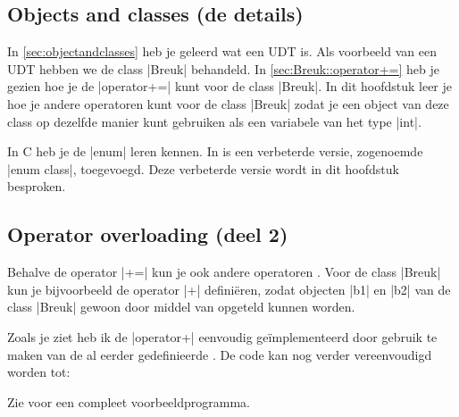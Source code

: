\begin{cpplstShortInline}
\chapter{Objects and classes (de details)}
\label{sec:objectsandclassesdetails}
In \cref{sec:objectandclasses} heb je geleerd wat een UDT is.
Als voorbeeld van een UDT hebben we de class |Breuk| behandeld.
In \cref{sec:Breuk::operator+=} heb je gezien hoe je de |operator+=| kunt  voor de class |Breuk|.
In dit hoofdstuk leer je hoe je andere operatoren kunt  voor de class |Breuk| zodat je een object van deze class op dezelfde manier kunt gebruiken als een variabele van het type |int|.

In C heb je de |enum| leren kennen.
In \Cpp{} is een verbeterde versie, zogenoemde |enum class|, toegevoegd.
Deze verbeterde versie wordt in dit hoofdstuk besproken. 

\section{Operator overloading (deel 2)}
Behalve de operator |+=| kun je ook andere operatoren . 
Voor de class |Breuk| kun je bijvoorbeeld de operator |+| definiëren, zodat objecten |b1| en |b2| van de class |Breuk| gewoon door middel van \hbox{} opgeteld kunnen worden. 

Zoals je ziet heb ik de |operator+| eenvoudig geïmplementeerd door gebruik te maken van de al eerder gedefinieerde . 
De code kan nog verder vereenvoudigd worden tot:

Zie  voor een compleet voorbeeldprogramma.


\end{cpplstShortInline}
